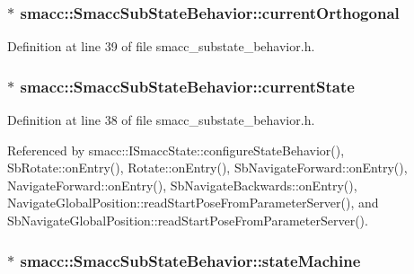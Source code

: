 \subsubsection[{\texorpdfstring{current\+Orthogonal}{currentOrthogonal}}]{$\ast$ smacc\+::\+Smacc\+Sub\+State\+Behavior\+::current\+Orthogonal}\hypertarget{classsmacc_1_1SmaccSubStateBehavior_a40aac919bb306d95838fdfcc34cfe391}{}\label{classsmacc_1_1SmaccSubStateBehavior_a40aac919bb306d95838fdfcc34cfe391}


Definition at line 39 of file smacc\+\_\+substate\+\_\+behavior.\+h.

\subsubsection[{\texorpdfstring{current\+State}{currentState}}]{$\ast$ smacc\+::\+Smacc\+Sub\+State\+Behavior\+::current\+State}\hypertarget{classsmacc_1_1SmaccSubStateBehavior_a62e2b9da4a446f09396d0b4c01659b88}{}\label{classsmacc_1_1SmaccSubStateBehavior_a62e2b9da4a446f09396d0b4c01659b88}


Definition at line 38 of file smacc\+\_\+substate\+\_\+behavior.\+h.



Referenced by smacc\+::\+I\+Smacc\+State\+::configure\+State\+Behavior(), Sb\+Rotate\+::on\+Entry(), Rotate\+::on\+Entry(), Sb\+Navigate\+Forward\+::on\+Entry(), Navigate\+Forward\+::on\+Entry(), Sb\+Navigate\+Backwards\+::on\+Entry(), Navigate\+Global\+Position\+::read\+Start\+Pose\+From\+Parameter\+Server(), and Sb\+Navigate\+Global\+Position\+::read\+Start\+Pose\+From\+Parameter\+Server().

\subsubsection[{\texorpdfstring{state\+Machine}{stateMachine}}]{$\ast$ smacc\+::\+Smacc\+Sub\+State\+Behavior\+::state\+Machine}\hypertarget{classsmacc_1_1SmaccSubStateBehavior_ae3ff8a316bdd4bc5b7fee59d19464609}{}\label{classsmacc_1_1SmaccSubStateBehavior_ae3ff8a316bdd4bc5b7fee59d19464609}


